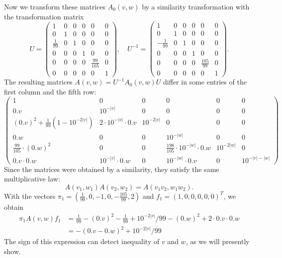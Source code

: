 \documentclass[a4paper,cleveref, autoref, thm-restate]{lipics-v2021}
\begin{document}
Now we transform these matrices
$A_0 (v,w)$
by a similarity transformation with the transformation matrix
\begin{equation}\label{eq:transform-U}
U= \begin{pmatrix}%
1 & 0 & 0 & 0 & 0 & 0 \\
0 & 1 & 0 & 0 & 0 & 0 \\
\frac{1}{99} & 0 & 1 & 0 & 0 & 0 \\
0 & 0 & 0 & 1 & 0 & 0 \\
0 & 0 & 0 & 0 & \frac{99}{105} & 0 \\
0 & 0 & 0 & 0 & 0 & 1
\end{pmatrix},\quad
U^{-1}= \begin{pmatrix}
1 & 0 & 0 & 0 & 0 & 0 \\
0 & 1 & 0 & 0 & 0 & 0 \\
-\frac{1}{99} & 0 & 1 & 0 & 0 & 0 \\
0 & 0 & 0 & 1 & 0 & 0 \\
0 & 0 & 0 & 0 & \frac{105}{99} & 0 \\
0 & 0 & 0 & 0 & 0 & 1
\end{pmatrix}.
\end{equation}
The resulting matrices
$A (v,w) = U^{-1} A_0 (v,w) U$
differ in some entries of the first column and the fifth row:
\begin{displaymath}
  \begin{pmatrix}%
1 & 0 & 0 & 0 & 0 & 0 \\
0.v & 10^{-|v|} & 0 & 0 & 0 & 0 \\
(0.v)^2 +
\frac{1}{99} (1{-}10^{-2|v|})
& 2 \cdot 10^{-|v|}\cdot 0.v & 10^{-2|v|} & 0 & 0 & 0 \\
0.w & 0 & 0 & 10^{-|w|} & 0 & 0 \\
\frac{99}{105}\cdot
(0.w)^2 & 0 & 0 &\!\!\!\!
\frac{198}{105} \cdot 10^{-|w|}\cdot 0.w & 10^{-2|w|} & 0 \\
0.v\cdot0.w & 10^{-|v|}\cdot 0.w & 0 & 10^{-|w|}\cdot 0.v & 0 &
\!\!\!\!
10^{-|v|-|w|}
                \end{pmatrix}
              \end{displaymath}
Since the matrices were obtained by a similarity, they satisfy the same multiplicative law:
\begin{equation}
  \label{eq:multi}
 A (v_1,w_1)
 A (v_2,w_2) =
 A (v_1v_2,w_1w_2).
\end{equation}         
With the vectors
$\pi_1=(\frac{1}{99},0,-1,0,-\frac{105}{99},2)$ and $f_1=(1,0,0,0,0,0)^T$,
we obtain
\begin{align}\nonumber
  \pi_1 A(v,w) f_1
 & = \tfrac{1}{99}
   - (0.v)^2 -\tfrac{1}{99} +10^{-2|v|}/99 -(0.w)^2
   +
   2\cdot 0.v\cdot0.w 
\\ & =
     - (0.v-0.w)^2 +10^{-2|v|}/99
     \label{eq:almost-zero}
\end{align}
The sign of this expression can detect inequality of $v$ and $w$, as
we
will presently show.
\end{document}
